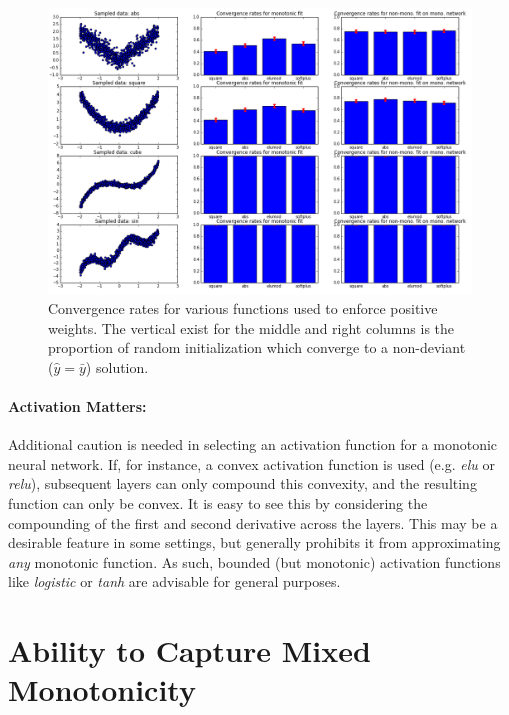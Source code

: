        \begin{figure}
            \centering
            \includegraphics[width=\textwidth]{fig_monofair/activation_function_convergence.png}
            \caption{Convergence rates for various functions used to enforce positive weights. The vertical exist for the middle and right columns is the proportion of random initialization which converge to a non-deviant ($\hat{y} = \bar{y}$) solution.}
            \label{fig:activations}
        \end{figure}

    \paragraph{Activation Matters:} 
        Additional caution is needed in selecting an activation function for a monotonic neural network.  If, for instance, a convex activation function is used (e.g. \textit{elu} or \textit{relu}), subsequent layers can only compound this convexity, and the resulting function can only be convex.  It is easy to see this by considering the compounding of the first and second derivative across the layers.  This may be a desirable feature in some settings, but generally prohibits it from approximating \textit{any} monotonic function.  As such, bounded (but monotonic) activation functions like \textit{logistic} or \textit{tanh} are advisable for general purposes.
    
\section{Ability to Capture Mixed Monotonicity}

